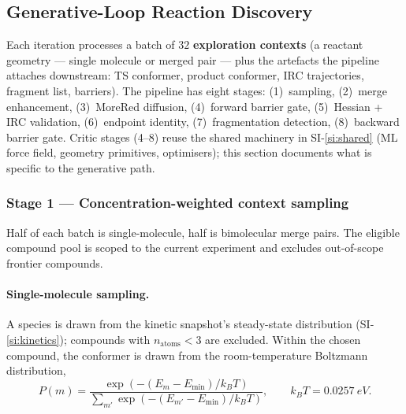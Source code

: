 %

\subsection{Generative-Loop Reaction Discovery}
\label{si:generative}

Each iteration processes a batch of $32$ \textbf{exploration contexts} (a reactant geometry --- single molecule or merged pair --- plus the artefacts the pipeline attaches downstream: TS conformer, product conformer, IRC trajectories, fragment list, barriers). The pipeline has eight stages: (1)~sampling, (2)~merge enhancement, (3)~MoreRed diffusion, (4)~forward barrier gate, (5)~Hessian + IRC validation, (6)~endpoint identity, (7)~fragmentation detection, (8)~backward barrier gate. Critic stages (4--8) reuse the shared machinery in SI-\ref{si:shared} (ML force field, geometry primitives, optimisers); this section documents what is specific to the generative path.


\subsubsection{Stage 1 --- Concentration-weighted context sampling}
\label{sec:sampling}

Half of each batch is single-molecule, half is bimolecular merge pairs. The eligible compound pool is scoped to the current experiment and excludes out-of-scope frontier compounds.

\paragraph{Single-molecule sampling.}
A species is drawn from the kinetic snapshot's steady-state distribution (SI-\ref{si:kinetics}); compounds with $n_\text{atoms} < 3$ are excluded. Within the chosen compound, the conformer is drawn from the room-temperature Boltzmann distribution,
\begin{equation}
    P(m) = \frac{\exp(-(E_m - E_\text{min}) / k_B T)}{\sum_{m'} \exp(-(E_{m'} - E_\text{min}) / k_B T)}, \qquad k_B T = \SI{0.0257}{eV}.
\end{equation}

